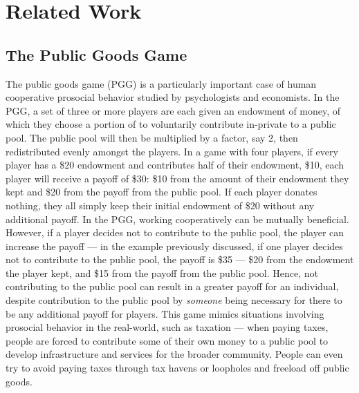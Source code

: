 \section{Related Work}
\subsection{The Public Goods Game}

The public goods game (PGG) is a particularly important case of human cooperative prosocial behavior studied by psychologists and economists. In the PGG, a set of three or more players are each given an endowment of money, of which they choose a portion of to voluntarily contribute in-private to a public pool. The public pool will then be multiplied by a factor, say 2, then redistributed evenly amongst the players. In a game with four players, if every player has a \$20 endowment and contributes half of their endowment, \$10, each player will receive a payoff of \$30: \$10 from the amount of their endowment they kept and \$20 from the payoff from the public pool. If each player donates nothing, they all simply keep their initial endowment of \$20 without any additional payoff. In the PGG, working cooperatively can be mutually beneficial. However, if a player decides not to contribute to the public pool, the player can increase the payoff — in the example previously discussed, if one player decides not to contribute to the public pool, the payoff is \$35 — \$20 from the endowment the player kept, and \$15 from the payoff from the public pool. Hence, not contributing to the public pool can result in a greater payoff for an individual, despite contribution to the public pool by \textit{someone} being necessary for there to be any additional payoff for players. This game mimics situations involving prosocial behavior in the real-world, such as taxation — when paying taxes, people are forced to contribute some of their own money to a public pool to develop infrastructure and services for the broader community. People can even try to avoid paying taxes through tax havens or loopholes and freeload off public goods.

